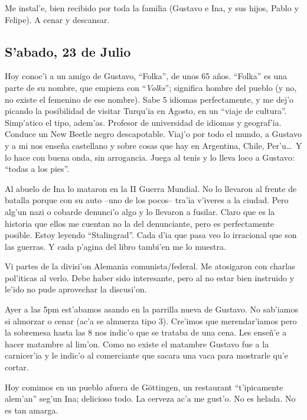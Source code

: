 Me instal'e, bien recibido por toda la familia (Gustavo e Ina, y sus hijos,
Pablo y Felipe). A cenar y descansar.

\subsection*{S'abado, 23 de Julio}

Hoy conoc'i a un amigo de Gustavo, ``Folka'', de unos 65 a\~nos. ``Folka'' es
una parte de su nombre, que empieza con ``\emph{Volks}''; significa hombre del
pueblo (y no, no existe el femenino de ese nombre). Sabe 5 idiomas
perfectamente, y me dej'o picando la posibilidad de visitar Turqu'ia en Agosto,
en un ``viaje de cultura''. Simp'atico el tipo, adem'as. Profesor de universidad
de idiomas y geograf'ia. Conduce un New Beetle negro descapotable. Viaj'o por
todo el mundo, a Gustavo y a mi nos ense\~na castellano y sobre cosas que hay en
Argentina, Chile, Per'u\ldots\ Y lo hace con buena onda, sin arrogancia. Juega
al tenis y lo lleva loco a Gustavo: ``todas a los pies''.

Al abuelo de Ina lo mataron en la II Guerra Mundial. No lo llevaron al frente de
batalla porque con su auto --uno de los pocos-- tra'ia v'iveres a la ciudad.
Pero alg'un nazi o cobarde denunci'o algo y lo llevaron a fusilar. Claro que es
la historia que ellos me cuentan no la del denunciante, pero es perfectamente
posible. Estoy leyendo ``Stalingrad''. Cada d'ia que pasa veo lo irracional que
son las guerras. Y cada p'agina del libro tambi'en me lo muestra.

Vi partes de la divisi'on Alemania comunista/federal. Me atosigaron con charlas
pol'iticas al verlo. Debe haber sido interesante, pero al no estar bien
instruido y le'ido no pude aprovechar la discusi'on.

Ayer a las 5pm est'abamos asando en la parrilla nueva de Gustavo. No sab'iamos
si almorzar o cenar (ac'a se almuerza tipo 3). Cre'imos que merendar'iamos pero
la sobremesa hasta las 8 nos indic'o que se trataba de una cena. Les ense\~n'e a
hacer matambre al lim'on. Como no existe el matambre Gustavo fue a la
carnicer'ia y le indic'o al comerciante que sacara una vaca para mostrarle qu'e
cortar.

Hoy comimos en un pueblo afuera de G\"ottingen, un restaurant ``t'ipicamente
alem'an'' seg'un Ina; delicioso todo. La cerveza ac'a me gust'o. No es helada.
No es tan amarga.

